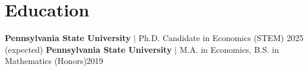 \section{Education}
  \resumeSubHeadingListStart
    \resumeSubSubheading
      {\textbf{Pennsylvania State University} $|$ Ph.D. Candidate in Economics (STEM) }{2025 (expected)}
      \resumeItemListStart
      \resumeItemListEnd
    \resumeSubSubheading
      {\textbf{Pennsylvania State University} $|$ M.A. in Economics, B.S. in Mathematics (Honors)}{2019}
  \resumeSubHeadingListEnd